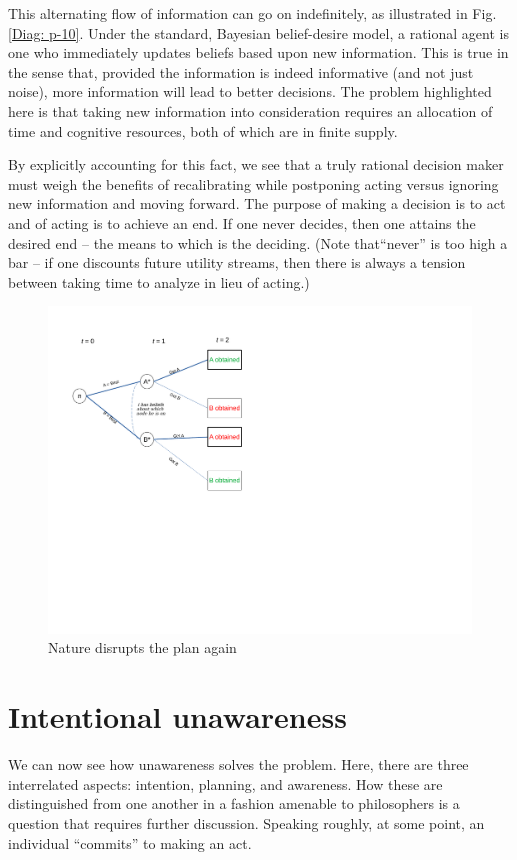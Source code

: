 \documentclass[
11pt,
titlepage,
reqno,
]{article}%
\theoremstyle{definition}
\begin{document}
This alternating flow of information can go on indefinitely, as illustrated in Fig. \ref{Diag: p-10}. Under the standard, Bayesian belief-desire model, a rational agent is one who immediately updates beliefs based upon new information. This is true in the sense that, provided the information is indeed informative (and not just noise), more information will lead to better decisions. The problem highlighted here is that taking new information into consideration requires an allocation of time and cognitive resources, both of which are in finite supply. 

By explicitly accounting for this fact, we see that a truly rational decision maker must weigh the benefits of recalibrating while postponing acting versus ignoring new information and moving forward. The purpose of making a decision is to act and of acting is to achieve an end. If one never decides, then one attains the desired end -- the means to which is the deciding. (Note that``never'' is too high a bar -- if one discounts future utility streams, then there is always a tension between taking time to analyze in lieu of acting.)

\begin{figure}[h!]
	\centering
	\includegraphics*[page=10,trim = 0 3.5in 0in 0in,scale=.65]{Awareness_Diagrams_All}
	\caption{Nature disrupts the plan again\label{Diag: p-10XX}}%
\end{figure}

\section*{Intentional unawareness}
We can now see how unawareness solves the problem. Here, there are three interrelated aspects: intention, planning, and awareness. How these are distinguished from one another in  a fashion amenable to philosophers is a question that requires further discussion. Speaking roughly, at some point, an individual ``commits'' to making an act.
\end{document}
